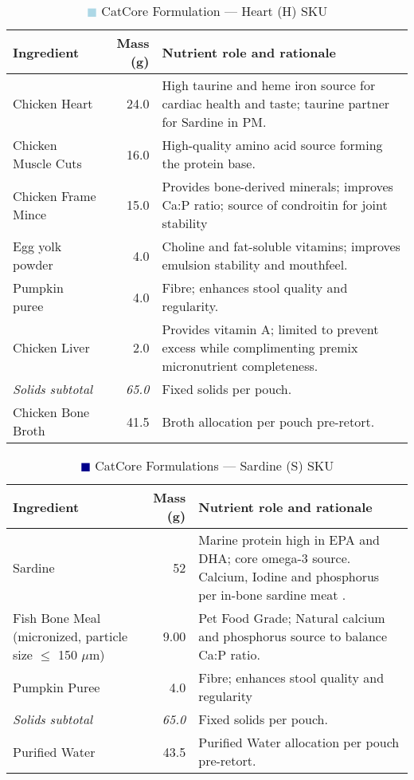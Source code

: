 \begin{table}[htbp]
\centering
\begin{adjustbox}{max width=\textwidth}
\begin{tabular}{@{}l r p{8.0cm}@{}}
\toprule
\textbf{Ingredient} & \textbf{Mass (g)} & \textbf{Nutrient role and rationale} \\
\midrule
Chicken Heart & 24.0 & High taurine and heme iron source for cardiac health and taste; taurine partner for Sardine in PM. \\[3pt]
Chicken Muscle Cuts & 16.0 & High-quality amino acid source forming the protein base. \\[3pt]
Chicken Frame Mince & 15.0 & Provides bone-derived minerals; improves Ca:P ratio; source of condroitin for joint stability \\[3pt]
Egg yolk powder & 4.0 & Choline and fat-soluble vitamins; improves emulsion stability and mouthfeel. \\[3pt]
Pumpkin puree & 4.0 & Fibre; enhances stool quality and regularity. \\[3pt]
Chicken Liver & 2.0 & Provides vitamin A; limited to prevent excess while complimenting premix micronutrient completeness. \\[3pt]
\textit{Solids subtotal} & \textit{65.0} & Fixed solids per pouch. \\[3pt]
Chicken Bone Broth & 41.5 & Broth allocation per pouch pre-retort. \\[3pt]
\bottomrule
\end{tabular}
\end{adjustbox}
\caption{\textcolor{lightblue}{$\blacksquare$} CatCore Formulation ---  Heart (H) SKU}
\label{tab:heart_sku_3col}
\end{table}

\begin{table}[htbp]
\centering
\caption{\textcolor{darkblue}{$\blacksquare$} CatCore Formulations --- Sardine (S) SKU}
\label{tab:sardine_sku_3col_mod}
\begin{adjustbox}{max width=\textwidth}
\begin{tabular}{@{}l r p{8.0cm}@{}}
\toprule
\textbf{Ingredient} & \textbf{Mass (g)} & \textbf{Nutrient role and rationale} \\
\midrule
Sardine & 52 & Marine protein high in EPA and DHA; core omega-3 source. Calcium, Iodine and phosphorus per in-bone sardine meat \cite{sardinecap}. \\[3pt]
Fish Bone Meal (micronized, particle size $\le$ 150 $\mu$m) & 9.00 & Pet Food Grade; Natural calcium and phosphorus source to balance Ca:P ratio. \\[3pt]
Pumpkin Puree & 4.0 & Fibre; enhances stool quality and regularity \\[3pt]
\textit{Solids subtotal} & \textit{65.0} & Fixed solids per pouch. \\[3pt]
Purified Water & 43.5 & Purified Water allocation per pouch pre-retort. \\[3pt]
\bottomrule
\end{tabular}
\end{adjustbox}
\end{table}

